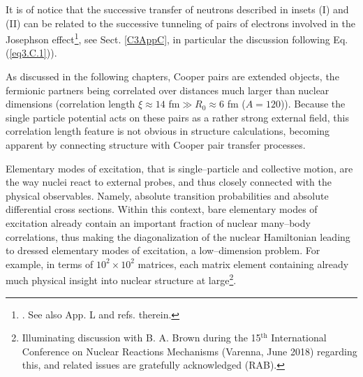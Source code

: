  It is of notice that the successive transfer of neutrons described in insets (I) and (II) can be related to the successive tunneling of pairs of electrons involved in the Josephson effect\footnote{\cite{Josephson:62,Anderson:64b}. See also \cite{Brink:05} App. L and refs. therein.},  see Sect. \ref{C3AppC}, in particular the discussion following Eq. (\ref{eq3.C.1})). 


As discussed in the following chapters, Cooper pairs are extended objects, the fermionic partners being correlated over distances much larger than nuclear dimensions 
(correlation length  $\xi\approx14$ fm$\gg R_0\approx 6$ fm ($A=120$)). Because the single particle potential acts on these pairs as a rather strong external field, this correlation length feature is not obvious in structure calculations, becoming apparent by connecting structure with Cooper pair transfer processes. 

Elementary modes of excitation, that is single--particle  and collective motion, are the way nuclei react to external probes, and thus closely connected with the  physical observables. Namely, absolute transition probabilities and absolute differential cross sections. Within this context, bare elementary modes of excitation already contain an important fraction of nuclear many--body correlations,  thus making the diagonalization of the nuclear Hamiltonian leading to dressed elementary modes of excitation, a low--dimension problem. For example, in terms of  $10^2\times10^2$ matrices, each matrix element containing already much  physical insight into nuclear structure at large\footnote{Illuminating discussion with B. A. Brown during the 15$^{\text{th}}$ International Conference on Nuclear Reactions Mechanisms (Varenna, June 2018) regarding this, and related issues are gratefully acknowledged (RAB).}. 


